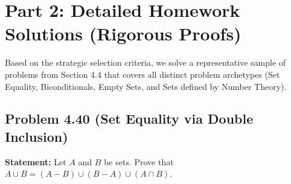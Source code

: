 \documentclass[11pt]{article}
\theoremstyle{definition}
\theoremstyle{remark}
\begin{document}
\newpage
\section{Part 2: Detailed Homework Solutions (Rigorous Proofs)}

Based on the strategic selection criteria, we solve a representative sample of problems from Section 4.4 that covers all distinct problem archetypes (Set Equality, Biconditionals, Empty Sets, and Sets defined by Number Theory).

\subsection{Problem 4.40 (Set Equality via Double Inclusion)}
\textbf{Statement:} Let $A$ and $B$ be sets. Prove that $A \cup B = (A - B) \cup (B - A) \cup (A \cap B)$.
\end{document}
